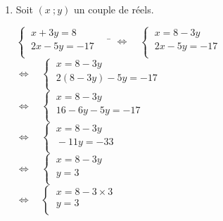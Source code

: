 \documentclass[a4paper,11pt,exos]{nsi} %
\begin{document}
\begin{enumerate}
    \item Soit $(x\ ;y)$ un couple de réels.
    \begin{tabbing}
        $\left\{
			\begin{array}{l}
				\ x+3y=8 \\
				\ 2x-5y=-17\\
			\end{array} \right. \quad$  \= $\iff\quad 
            \left\{
                \begin{array}{l}
				\ x=8-3y \\
				\ 2x-5y=-17\\
			\end{array} \right.$\\[.5em]

            \> $\iff\quad 
            \left\{
                \begin{array}{l}
				\ x=8-3y \\
				\ 2(8-3y)-5y=-17\\
			\end{array} \right.$\\[.5em]

            \> $\iff\quad 
            \left\{
                \begin{array}{l}
				\ x=8-3y \\
				\ 16-6y-5y=-17\\
			\end{array} \right.$\\[.5em]

            \> $\iff\quad 
            \left\{
                \begin{array}{l}
				\ x=8-3y \\
				\ -11y=-33\\
			\end{array} \right.$\\[.5em]

            \> $\iff\quad 
            \left\{
                \begin{array}{l}
				\ x=8-3y \\
				\ y=3\\
			\end{array} \right.$\\[.5em]

            \> $\iff\quad 
            \left\{
                \begin{array}{l}
				\ x=8-3\times 3 \\
				\ y=3\\
			\end{array} \right.$\\[.5em]


\end{tabbing}
\end{enumerate}
\end{document}
